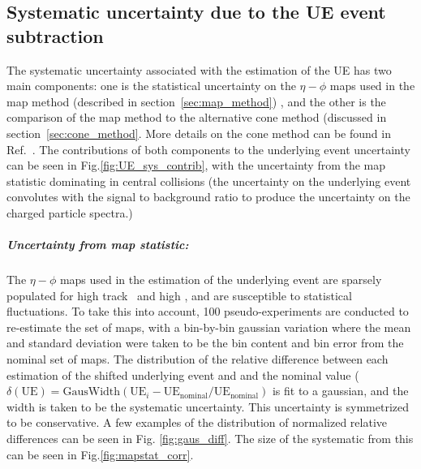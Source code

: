 \subsection{Systematic uncertainty due to the UE event subtraction}
The systematic uncertainty associated with the estimation of the UE has two main components: one is the statistical uncertainty on the $\eta-\phi$ maps used in the map method (described in section~\ref{sec:map_method}) , and the other is the comparison of the map method to the alternative cone method (discussed in section~\ref{sec:cone_method}.
More details on the cone method can be found in Ref.~\cite{PhysRevC.98.024908}.
The contributions of both components to the underlying event uncertainty can be seen in Fig.\ref{fig:UE_sys_contrib}, with the uncertainty from the map statistic dominating in central collisions (the uncertainty on the underlying event convolutes with the signal to background ratio to produce the uncertainty on the charged particle spectra.)

\subparagraph{Uncertainty from map statistic:} 
The $\eta-\phi$ maps used in the estimation of the underlying event are sparsely populated for high track \pt\ and high \ptjet, and are susceptible to statistical fluctuations.
To take this into account, 100 pseudo-experiments are conducted to re-estimate the set of maps, with a bin-by-bin gaussian variation where the mean and standard deviation were taken to be the bin content and bin error from the nominal set of maps.
The distribution of the relative difference between each estimation of the shifted underlying event and and the nominal value ( $\delta (\mathrm{UE}) = \mathrm{GausWidth}(\mathrm{UE}_i - \mathrm{UE}_{\mathrm{nominal}} / \mathrm{UE}_{\mathrm{nominal}})$ is fit to a gaussian, and the width is taken to be the systematic uncertainty.
This uncertainty is symmetrized to be conservative.
 A few examples of the distribution of normalized relative differences can be seen in Fig.
\ref{fig:gaus_diff}.
The size of the systematic from this can be seen in Fig.\ref{fig:mapstat_corr}.

